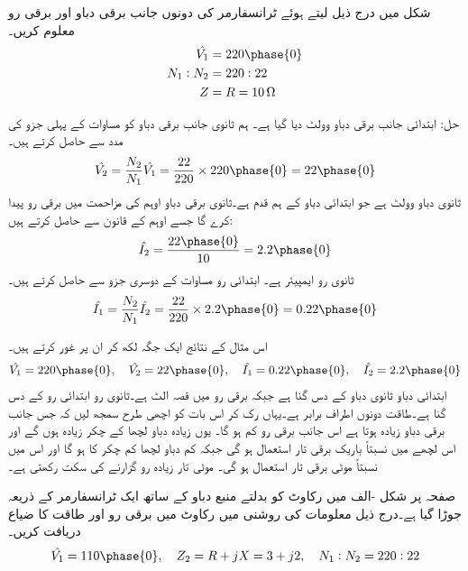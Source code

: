شکل    میں درج ذیل لیتے ہوئے ٹرانسفارمر کی دونوں جانب برقی دباو اور برقی رو معلوم کریں۔
\begin{align*}
\hat{V_1}&=220 \phase{0}\\
N_1:N_2&=220:22\\
Z&=R=\SI{10}{\ohm}
\end{align*}


حل:\quad 
ابتدائی جانب برقی دباو   وولٹ دیا گیا ہے۔ ہم  ثانوی جانب برقی دباو کو مساوات  کے پہلی جزو کی مدد سے حاصل کرتے ہیں۔
\begin{align*}
\hat{V_2}=\frac{N_2}{N_1} \hat{V_1}=\frac{22}{220} \times 220\phase {0}=22\phase{0}
\end{align*}
ثانوی دباو  وولٹ ہے جو ابتدائی  دباو کے ہم قدم ہے۔ثانوی برقی دباو  اوہم کی مزاحمت میں برقی رو پیدا کرے گا جسے اوہم کے قانون سے حاصل کرتے ہیں:
\begin{align*}
\hat{I_2}=\frac{22 \phase {0}}{10}=2.2\phase {0}
\end{align*}
ثانوی رو  ایمپیئر  ہے۔ ابتدائی رو مساوات  کے دوسری جزو سے حاصل کرتے ہیں۔
\begin{align*}
\hat{I_1}=\frac{N_2}{N_1} \hat{I_2}=\frac{22}{220} \times 2.2\phase{0}=0.22\phase{0}
\end{align*}

اس مثال کے نتائج ایک جگہ لکھ کر ان پر غور کرتے ہیں۔
\begin{align*}
\hat{V_1}=220\phase{0}, \quad \hat{V_2}=22\phase{0}, \quad \hat{I_1}=0.22\phase{0}, \quad \hat{I_2}=2.2\phase{0}
\end{align*}
ابتدائی دباو ثانوی  دباو کے دس گنا ہے جبکہ برقی رو میں قصہ الٹ ہے۔ثانوی رو ابتدائی رو کے دس گنا ہے۔طاقت دونوں اطراف  برابر ہے۔یہاں رک کر  اس بات کو اچھی طرح سمجھ لیں کہ جس جانب برقی دباو زیادہ ہوتا ہے اس جانب برقی رو کم ہو گا۔ یوں زیادہ دباو  لچھا کے چکر زیادہ ہوں گے اور اس لچھے میں نسبتاً باریک برقی تار استعمال ہو گی جبکہ کم  دباو لچھا کم چکر کا ہو گا اور اس میں نسبتاً موٹی برقی تار استعمال ہو گی۔ موٹی تار زیادہ رو گزارنے  کی سکت رکھتی ہے۔ 


صفحہ  پر شکل -الف  میں رکاوٹ  کو  بدلتے منبع دباو  کے ساتھ ایک ٹرانسفارمر کے ذریعہ جوڑا گیا ہے۔درج ذیل معلومات کی روشنی میں رکاوٹ میں برقی رو اور طاقت کا ضیاع دریافت کریں۔
\begin{align*}
\hat{V_1}=110\phase{0},\quad Z_2=R+j X=3+j 2,\quad N_1:N_2=220:22 
\end{align*}

